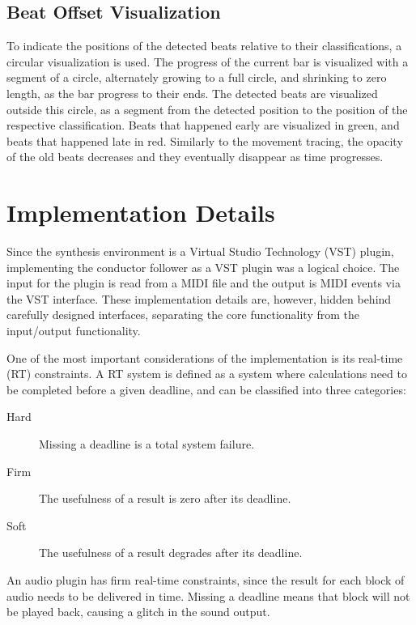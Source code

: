 \section{Beat Offset Visualization}

To indicate the positions of the detected beats
relative to their classifications,
a circular visualization is used.
The progress of the current bar
is visualized with a segment of a circle,
alternately growing to a full circle,
and shrinking to zero length,
as the bar progress to their ends.
The detected beats are visualized outside this circle,
as a segment from the detected position
to the position of the respective classification.
Beats that happened early are visualized in green,
and beats that happened late in red.
Similarly to the movement tracing,
the opacity of the old beats decreases
and they eventually disappear as time progresses.


\chapter{Implementation Details}
\label{chapter:implementation_details}

Since the synthesis environment is a
Virtual Studio Technology (VST) plugin,
implementing the conductor follower as a VST plugin was a logical choice.
The input for the plugin is read from a MIDI file
and the output is MIDI events via the VST interface.
These implementation details are, however, hidden behind
carefully designed interfaces,
separating the core functionality from the input/output functionality.

One of the most important considerations of the implementation
is its real-time (RT) constraints.
A RT system is defined as a system where calculations
need to be completed before a given deadline,
and can be classified into three categories:
\begin{description}
\item[Hard]
Missing a deadline is a total system failure.
\item[Firm]
The usefulness of a result is zero after its deadline.
\item[Soft]
The usefulness of a result degrades after its deadline.
\end{description}
An audio plugin has firm real-time constraints,
since the result for each block of audio needs to be delivered in time.
Missing a deadline means that block will not be played back,
causing a glitch in the sound output.


